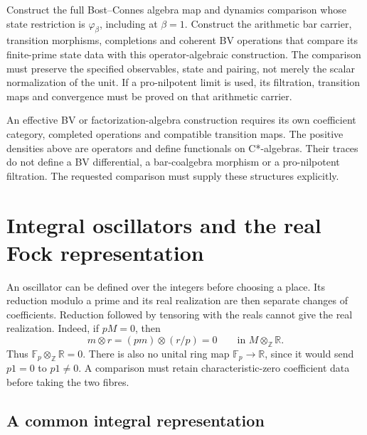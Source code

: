 \begin{question}
\label{v4-arith:pos-costello:thm:C3-closed}
Construct the full Bost--Connes algebra map and dynamics comparison
whose state restriction is \(\varphi_\beta\), including at
\(\beta=1\). Construct the arithmetic bar carrier, transition
morphisms, completions and coherent BV operations that compare its
finite-prime state data with this operator-algebraic construction.
The comparison must preserve the specified observables, state and
pairing, not merely the scalar normalization of the unit.
If a pro-nilpotent limit is used, its filtration, transition maps
and convergence must be proved on that arithmetic carrier.
\end{question}
\begin{remark}
\label{v4-arith:pos-costello:rem:Hinich}
An effective BV or factorization-algebra construction requires its
own coefficient category, completed operations and compatible
transition maps. The positive densities above are operators and
define functionals on C*-algebras. Their traces do not define a BV
differential, a bar-coalgebra morphism or a pro-nilpotent filtration.
The requested comparison must supply these structures explicitly.
\end{remark}

\section{Integral oscillators and the real Fock representation}
\label{v4-arith:c4-integral-comparison}
\label{v4-arith:pos-costello:C4}

An oscillator can be defined over the integers before choosing a place.
Its reduction modulo a prime and its real realization are then separate
changes of coefficients. Reduction followed by tensoring with the reals
cannot give the real realization. Indeed, if $pM=0$, then
\[
 m\otimes r=(pm)\otimes(r/p)=0
 \qquad\text{in }M\otimes_{\mathbb Z}\mathbb R.
\]
Thus $\mathbb F_p\otimes_{\mathbb Z}\mathbb R=0$.
There is also no unital ring map $\mathbb F_p\to\mathbb R$, since it
would send $p1=0$ to $p1\ne0$. A comparison must retain characteristic-zero
coefficient data before taking the two fibres.

\subsection{A common integral representation}

